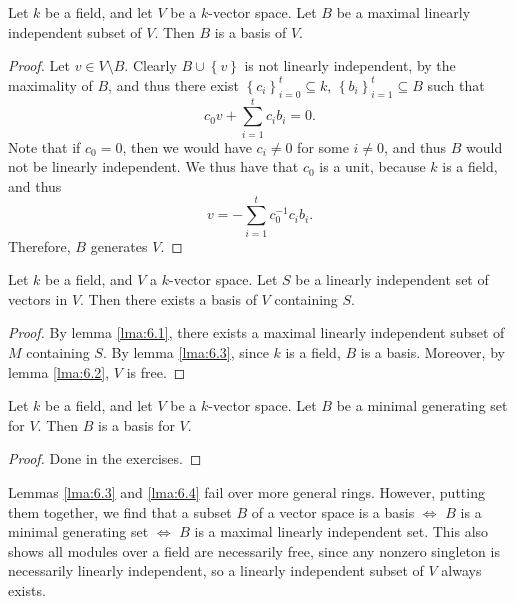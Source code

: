 \begin{lemma}\label{lma:6.3}
	Let $k$ be a field, and let $V$ be a $k$-vector space. Let $B$ be a maximal linearly independent subset of $V$. Then $B$ is a basis of $V$.
\end{lemma}
\begin{proof}
	Let $v\in V\setminus B$. Clearly $B\cup \left\{ v \right\} $ is not linearly independent, by the maximality of $B$, and thus there exist $\left\{ c_{i} \right\}_{i=0}^t \subseteq k$, $\left\{ b_i \right\}_{i=1}^t\subseteq B$ such that
	\[
		c_0v+\sum_{i=1}^{t} c_ib_i=0
	.\]
	Note that if $c_0=0$, then we would have $c_i\neq 0$ for some $i\neq 0$, and thus $B$ would not be linearly independent. We thus have that $c_0$ is a unit, because $k$ is a field, and thus
	\[
		v=-\sum_{i=1}^{t} c_0^{-1} c_ib_i
	.\]
	Therefore, $B$ generates $V$.
\end{proof}
\begin{proposition}\label{prp:6.1}
	Let $k$ be a field, and $V$ a $k$-vector space. Let $S$ be a linearly independent set of vectors in $V$. Then there exists a basis of $V$ containing $S$.
\end{proposition}
\begin{proof}
	By lemma \ref{lma:6.1}, there exists a maximal linearly independent subset of $M$ containing $S$. By lemma \ref{lma:6.3}, since $k$ is a field, $B$ is a basis. Moreover, by lemma \ref{lma:6.2}, $V$ is free.
\end{proof}
\begin{lemma}\label{lma:6.4}
	Let $k$ be a field, and let $V$ be a $k$-vector space. Let $B$ be a minimal generating set for $V$. Then $B$ is a basis for $V$.
\end{lemma}
\begin{proof}
	Done in the exercises.
\end{proof}

Lemmas \ref{lma:6.3} and \ref{lma:6.4} fail over more general rings. However, putting them together, we find that a subset $B$ of a vector space is a basis $\iff $ $B$ is a minimal generating set $\iff$ $B$ is a maximal linearly independent set. This also shows all modules over a field are necessarily free, since any nonzero singleton is necessarily linearly independent, so a linearly independent subset of $V$ always exists.

